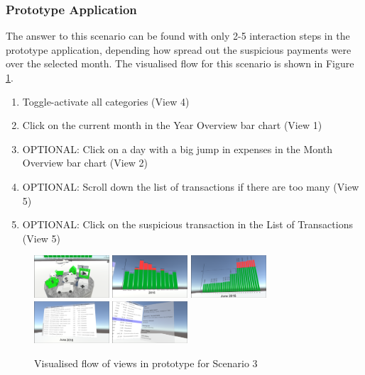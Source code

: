 
\subsubsection{Prototype Application}

The answer to this scenario can be found with only 2-5 interaction steps in the prototype application, depending how spread out the suspicious payments were over the selected month. The visualised flow for this scenario is shown in Figure \ref{fig:scenariothreeprototype}.
\begin{enumerate}
	\item Toggle-activate all categories (View 4)
	\item Click on the current month in the Year Overview bar chart (View 1)
	\item OPTIONAL: Click on a day with a big jump in expenses in the Month Overview bar chart (View 2)
	\item OPTIONAL: Scroll down the list of transactions if there are too many (View 5)
	\item OPTIONAL: Click on the suspicious transaction in the List of Transactions (View 5)
\end{enumerate}
\begin{figure}[h]
	\begin{center}
		\includegraphics[width=2.8cm]{03_Figures/08_Development/View4_CategoriesFiltering.png}
		\includegraphics[width=2.8cm]{03_Figures/08_Development/View1_YearOverview.png}
		\includegraphics[width=2.8cm]{03_Figures/08_Development/View2_MonthOverview.png}
		\includegraphics[width=2.8cm]{03_Figures/08_Development/View5_FinTransactionsOverview.png}
		\includegraphics[width=2.8cm]{03_Figures/08_Development/View6_FinTransactionDetails.png}
		\caption{Visualised flow of views in prototype for Scenario 3}
		\label{fig:scenariothreeprototype}
	\end{center}
\end{figure}

